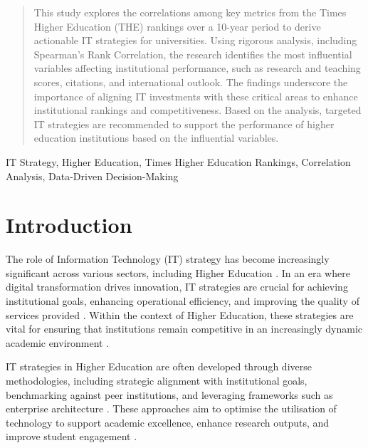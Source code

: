 \documentclass[conference]{IEEEtran}
\begin{document}
\newcommand{\al}[1]{{\textbf{\color{blue} Al: #1}}}

\maketitle

\begin{abstract}
	This study explores the correlations among key metrics from the Times Higher Education (THE) rankings over a 10-year period to derive actionable IT strategies for universities. Using rigorous analysis, including Spearman's Rank Correlation, the research identifies the most influential variables affecting institutional performance, such as research and teaching scores, citations, and international outlook. The findings underscore the importance of aligning IT investments with these critical areas to enhance institutional rankings and competitiveness. Based on the analysis, targeted IT strategies are recommended to support the performance of higher education institutions based on the influential variables.
\end{abstract}

\begin{IEEEkeywords}
	IT Strategy, Higher Education, Times Higher Education Rankings, Correlation Analysis, Data-Driven Decision-Making
\end{IEEEkeywords}


\section{Introduction}


The role of Information Technology (IT) strategy has become increasingly significant across various sectors, including Higher Education \cite{hashim2021higher}. In an era where digital transformation drives innovation, IT strategies are crucial for achieving institutional goals, enhancing operational efficiency, and improving the quality of services provided \cite{rahmadi2024research}. Within the context of Higher Education, these strategies are vital for ensuring that institutions remain competitive in an increasingly dynamic academic environment \cite{fernandez2023digital}.

IT strategies in Higher Education are often developed through diverse methodologies, including strategic alignment with institutional goals, benchmarking against peer institutions, and leveraging frameworks such as enterprise architecture \cite{bianchi2023it}. These approaches aim to optimise the utilisation of technology to support academic excellence, enhance research outputs, and improve student engagement \cite{digitalsystems2022strategy}.
\end{document}
